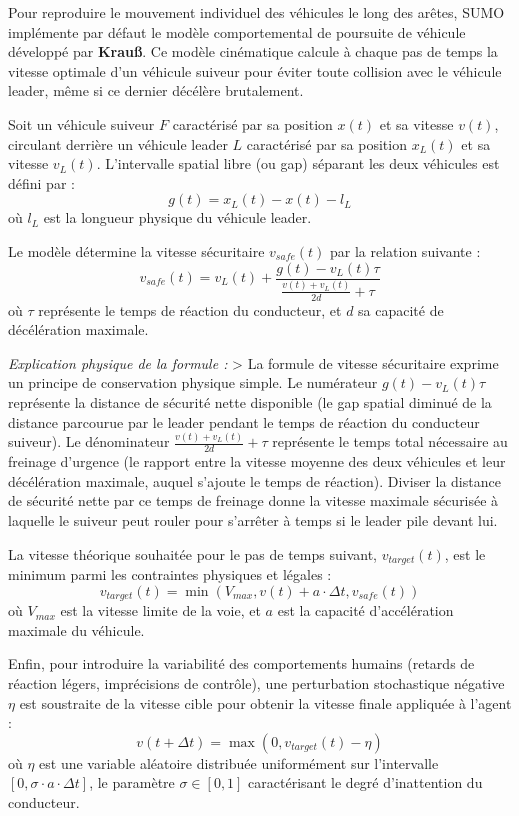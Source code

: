 \documentclass[10pt, a4paper]{article}
\begin{document}
Pour reproduire le mouvement individuel des véhicules le long des
arêtes, SUMO implémente par défaut le modèle comportemental de poursuite
de véhicule développé par \textbf{Krauß}. Ce modèle cinématique calcule
à chaque pas de temps la vitesse optimale d'un véhicule suiveur pour
éviter toute collision avec le véhicule leader, même si ce dernier
décélère brutalement.

Soit un véhicule suiveur \(F\) caractérisé par sa position \(x(t)\) et
sa vitesse \(v(t)\), circulant derrière un véhicule leader \(L\)
caractérisé par sa position \(x_L(t)\) et sa vitesse \(v_L(t)\).
L'intervalle spatial libre (ou gap) séparant les deux véhicules est
défini par : \[g(t) = x_L(t) - x(t) - l_L\] où \(l_L\) est la longueur
physique du véhicule leader.

Le modèle détermine la vitesse sécuritaire \(v_{safe}(t)\) par la
relation suivante :
\[v_{safe}(t) = v_L(t) + \frac{g(t) - v_L(t)\tau}{\frac{v(t) + v_L(t)}{2d} + \tau}\]
où \(\tau\) représente le temps de réaction du conducteur, et \(d\) sa
capacité de décélération maximale.

\emph{Explication physique de la formule :} \textgreater{} La formule de
vitesse sécuritaire exprime un principe de conservation physique simple.
Le numérateur \(g(t) - v_L(t)\tau\) représente la distance de sécurité
nette disponible (le gap spatial diminué de la distance parcourue par le
leader pendant le temps de réaction du conducteur suiveur). Le
dénominateur \(\frac{v(t) + v_L(t)}{2d} + \tau\) représente le temps
total nécessaire au freinage d'urgence (le rapport entre la vitesse
moyenne des deux véhicules et leur décélération maximale, auquel
s'ajoute le temps de réaction). Diviser la distance de sécurité nette
par ce temps de freinage donne la vitesse maximale sécurisée à laquelle
le suiveur peut rouler pour s'arrêter à temps si le leader pile devant
lui.

La vitesse théorique souhaitée pour le pas de temps suivant,
\(v_{target}(t)\), est le minimum parmi les contraintes physiques et
légales :
\[v_{target}(t) = \min\left( V_{max}, v(t) + a \cdot \Delta t, v_{safe}(t) \right)\]
où \(V_{max}\) est la vitesse limite de la voie, et \(a\) est la
capacité d'accélération maximale du véhicule.

Enfin, pour introduire la variabilité des comportements humains (retards
de réaction légers, imprécisions de contrôle), une perturbation
stochastique négative \(\eta\) est soustraite de la vitesse cible pour
obtenir la vitesse finale appliquée à l'agent :
\[v(t + \Delta t) = \max\left( 0, v_{target}(t) - \eta \right)\] où
\(\eta\) est une variable aléatoire distribuée uniformément sur
l'intervalle \([0, \sigma \cdot a \cdot \Delta t]\), le paramètre
\(\sigma \in [0, 1]\) caractérisant le degré d'inattention du
conducteur.
\end{document}
